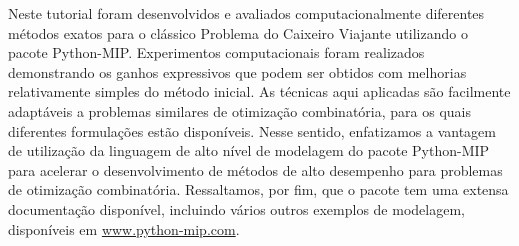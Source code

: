 \documentclass[a4paper,11pt,fleqn]{article}
\begin{document}
Neste tutorial foram desenvolvidos e avaliados computacionalmente diferentes métodos exatos para o clássico Problema do Caixeiro Viajante utilizando o pacote Python-MIP. 
Experimentos computacionais foram realizados demonstrando os ganhos expressivos que podem ser obtidos com melhorias relativamente simples do método inicial.
As técnicas aqui aplicadas são facilmente adaptáveis a problemas similares de otimização combinatória, para os quais diferentes formulações estão disponíveis. 
Nesse sentido, enfatizamos a vantagem de utilização da linguagem de alto nível de modelagem do pacote Python-MIP para acelerar o desenvolvimento de métodos de alto desempenho para problemas de otimização combinatória. 
Ressaltamos, por fim, que o pacote tem uma extensa documentação disponível, incluindo vários outros exemplos de modelagem, disponíveis em \url{www.python-mip.com}.



\end{document}
